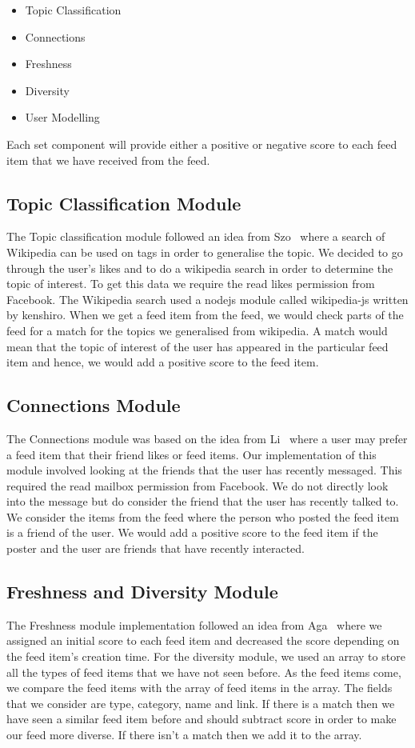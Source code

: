 \begin{itemize}
	\item Topic Classification
	\item Connections
	\item Freshness
	\item Diversity
	\item User Modelling
\end{itemize}

Each set component will provide either a positive or negative score to each feed item that we have received from the feed.

\subsection{Topic Classification Module}
The Topic classification module followed an idea from Szo~\cite{szomszor2008semantic} where a search of Wikipedia can be used on tags in order to generalise the topic. We decided to go through the user's likes and to do a wikipedia search in order to determine the topic of interest. To get this data we require the read likes permission from Facebook. The Wikipedia search used a nodejs module called wikipedia-js written by kenshiro. When we get a feed item from the feed, we would check parts of the feed for a match for the topics we generalised from wikipedia. A match would mean that the topic of interest of the user has appeared in the particular feed item and hence, we would add a positive score to the feed item.

\subsection{Connections Module}
The Connections module was based on the idea from Li~\cite{LiTiaLee2010} where a user may prefer a feed item that their friend likes or feed items. Our implementation of this module involved looking at the friends that the user has recently messaged. This required the read mailbox permission from Facebook. We do not directly look into the message but do consider the friend that the user has recently talked to. We consider the items from the feed where the person who posted the feed item is a friend of the user. We would add a positive score to the feed item if the poster and the user are friends that have recently interacted.

\subsection{Freshness and Diversity Module}
The Freshness module implementation followed an idea from Aga~\cite{Aga2014} where we assigned an initial score to each feed item and decreased the score depending on the feed item’s creation time. For the diversity module, we used an array to store all the types of feed items that we have not seen before. As the feed items come, we compare the feed items with the array of feed items in the array. The fields that we consider are type, category, name and link. If there is a match then we have seen a similar feed item before and should subtract score in order to make our feed more diverse. If there isn’t a match then we add it to the array.

